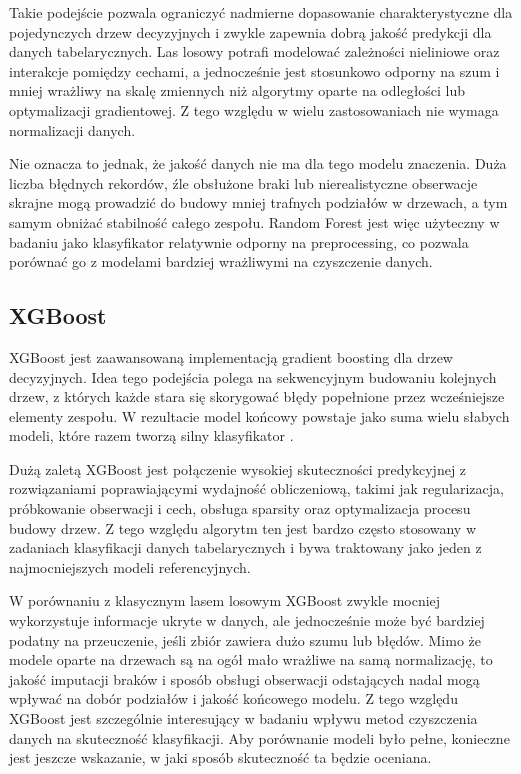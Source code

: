 {Takie podejście pozwala ograniczyć nadmierne dopasowanie charakterystyczne dla pojedynczych drzew decyzyjnych i zwykle zapewnia dobrą jakość predykcji dla danych tabelarycznych. Las losowy potrafi modelować zależności nieliniowe oraz interakcje pomiędzy cechami, a jednocześnie jest stosunkowo odporny na szum i mniej wrażliwy na skalę zmiennych niż algorytmy oparte na odległości lub optymalizacji gradientowej. Z tego względu w wielu zastosowaniach nie wymaga normalizacji danych.

Nie oznacza to jednak, że jakość danych nie ma dla tego modelu znaczenia. Duża liczba błędnych rekordów, źle obsłużone braki lub nierealistyczne obserwacje skrajne mogą prowadzić do budowy mniej trafnych podziałów w drzewach, a tym samym obniżać stabilność całego zespołu. Random Forest jest więc użyteczny w badaniu jako klasyfikator relatywnie odporny na preprocessing, co pozwala porównać go z modelami bardziej wrażliwymi na czyszczenie danych.

\subsection{XGBoost}
XGBoost jest zaawansowaną implementacją gradient boosting dla drzew decyzyjnych. Idea tego podejścia polega na sekwencyjnym budowaniu kolejnych drzew, z których każde stara się skorygować błędy popełnione przez wcześniejsze elementy zespołu. W rezultacie model końcowy powstaje jako suma wielu słabych modeli, które razem tworzą silny klasyfikator \cite{ChenGuestrin2016,XGBoostDocs}.

Dużą zaletą XGBoost jest połączenie wysokiej skuteczności predykcyjnej z rozwiązaniami poprawiającymi wydajność obliczeniową, takimi jak regularizacja, próbkowanie obserwacji i cech, obsługa sparsity oraz optymalizacja procesu budowy drzew. Z tego względu algorytm ten jest bardzo często stosowany w zadaniach klasyfikacji danych tabelarycznych i bywa traktowany jako jeden z najmocniejszych modeli referencyjnych.

W porównaniu z klasycznym lasem losowym XGBoost zwykle mocniej wykorzystuje informacje ukryte w danych, ale jednocześnie może być bardziej podatny na przeuczenie, jeśli zbiór zawiera dużo szumu lub błędów. Mimo że modele oparte na drzewach są na ogół mało wrażliwe na samą normalizację, to jakość imputacji braków i sposób obsługi obserwacji odstających nadal mogą wpływać na dobór podziałów i jakość końcowego modelu. Z tego względu XGBoost jest szczególnie interesujący w badaniu wpływu metod czyszczenia danych na skuteczność klasyfikacji. Aby porównanie modeli było pełne, konieczne jest jeszcze wskazanie, w jaki sposób skuteczność ta będzie oceniana.
}
